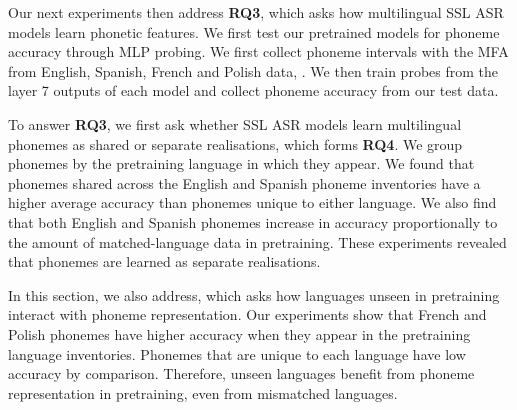 

Our next experiments then address \textbf{RQ3}, which asks how multilingual SSL ASR models learn phonetic features. We first test our pretrained models for phoneme accuracy through MLP probing. We first collect phoneme intervals with the MFA \cite{mcauliffe2017montreal} from English, Spanish, French and Polish data, \cite{librispeech, MLS}. We then train probes from the layer 7 outputs of each model and collect phoneme accuracy from our test data.

To answer \textbf{RQ3}, we first ask whether SSL ASR models learn multilingual phonemes as shared or separate realisations, which forms \textbf{RQ4}. We group phonemes by the pretraining language in which they appear. We found that phonemes shared across the English and Spanish phoneme inventories have a higher average accuracy than phonemes unique to either language. We also find that both English and Spanish phonemes increase in accuracy proportionally to the amount of matched-language data in pretraining. These experiments revealed that phonemes are learned as separate realisations. 

In this section, we also address, which asks how languages unseen in pretraining interact with phoneme representation. Our experiments show that French and Polish phonemes have higher accuracy when they appear in the pretraining language inventories. Phonemes that are unique to each language have low accuracy by comparison. Therefore, unseen languages benefit from phoneme representation in pretraining, even from mismatched languages.





